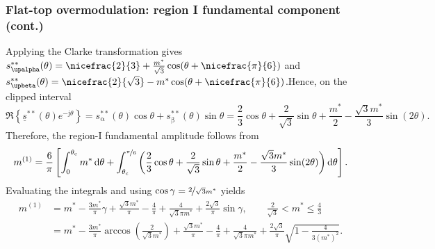\begin{frame}
    \frametitle{Flat-top overmodulation: region I fundamental component (cont.)}
    Applying the Clarke transformation gives
    $s_{\upalpha}^{**}(\theta)=\nicefrac{2}{3}+\frac{m^*}{\sqrt{3}}\cos\!\left(\theta+\nicefrac{\pi}{6}\right)$ and $s_{\upbeta}^{**}(\theta)=\nicefrac{2}{\sqrt{3}}-m^*\cos\!\left(\theta+\nicefrac{\pi}{6}\right)$.Hence, on the clipped interval
    \begin{equation}
        \Re\!\left\{\underline{s}^{**}(\theta)e^{-\mathrm{j}\theta}\right\}
        =
        s_{\upalpha}^{**}(\theta)\cos\theta+s_{\upbeta}^{**}(\theta)\sin\theta
        =
        \frac{2}{3}\cos\theta+\frac{2}{\sqrt{3}}\sin\theta+\frac{m^*}{2}-\frac{\sqrt{3}m^*}{3}\sin(2\theta).
        \label{eq:flat_top_region1_integrand}
    \end{equation}\pause
    Therefore, the region-I fundamental amplitude follows from
    \begin{equation}
        m^{(1)}=
        \frac{6}{\pi}
        \left[
            \int_{0}^{\theta_\mathrm{c}} m^*\,\mathrm{d}\theta
            +
            \int_{\theta_\mathrm{c}}^{\nicefrac{\pi}{6}}
            \left(
            \frac{2}{3}\cos\theta+\frac{2}{\sqrt{3}}\sin\theta+\frac{m^*}{2}-\frac{\sqrt{3}m^*}{3}\sin(2\theta)
            \right)\mathrm{d}\theta
            \right].
        \label{eq:flat_top_region1_integral}
    \end{equation}\pause
    Evaluating the integrals and using \(\cos\gamma=\nicefrac{2}{\sqrt{3}m^*}\) yields
    \begin{equation}
        \begin{split}
            m^{(1)}
             & =
            m^*
            -\frac{3m^*}{\pi}\gamma
            +\frac{\sqrt{3}m^*}{\pi}
            -\frac{4}{\pi}
            +\frac{4}{\sqrt{3}\pi m^*}
            +\frac{2\sqrt{3}}{\pi}\sin\gamma,
            \qquad
            \frac{2}{\sqrt{3}}<m^*\leq \frac{4}{3} \\
             & =
            m^*
            -\frac{3m^*}{\pi}\arccos\!\left(\frac{2}{\sqrt{3}m^*}\right)
            +\frac{\sqrt{3}m^*}{\pi}
            -\frac{4}{\pi}
            +\frac{4}{\sqrt{3}\pi m^*}
            +\frac{2\sqrt{3}}{\pi}\sqrt{1-\frac{4}{3(m^*)^2}}.
        \end{split}
        \label{eq:flat_top_region1_closed_form}
    \end{equation}
\end{frame}

